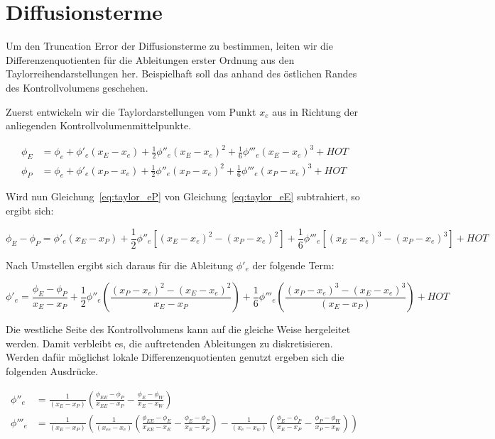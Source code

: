 \documentclass[10pt, ngerman,colorback,accentcolor=tud2d]{tudreport}
\begin{document}
\section{Diffusionsterme}
\label{sec:Diffusionsterme}


Um den Truncation Error der Diffusionsterme zu bestimmen, leiten wir die Differenzenquotienten
für die Ableitungen erster Ordnung aus den Taylorreihendarstellungen her. Beispielhaft
soll das anhand des östlichen Randes des Kontrollvolumens geschehen.

Zuerst entwickeln wir die Taylordarstellungen vom Punkt $x_e$ aus in Richtung der anliegenden
Kontrollvolumenmittelpunkte.

\begin{align}
  \phi_E &= \phi_e + \phi'_e(x_E-x_e)+\frac{1}{2}\phi''_e(x_E-x_e)^2
  +\frac{1}{6}\phi'''_e(x_E-x_e)^3+HOT
  \label{eq:taylor_eE}\\
  \phi_P &= \phi_e + \phi'_e(x_P-x_e)+\frac{1}{2}\phi''_e(x_P-x_e)^2
  +\frac{1}{6}\phi'''_e(x_P-x_e)^3+HOT
  \label{eq:taylor_eP}
\end{align}

Wird nun Gleichung~\ref{eq:taylor_eP} von Gleichung~\ref{eq:taylor_eE} subtrahiert, 
so ergibt sich:

\begin{equation*}
  \phi_E-\phi_P=\phi'_e(x_E-x_P)+
  \frac{1}{2}\phi''_e\left[{{(x_E-x_e)}^2-{(x_P-x_e)}^2}\right]+
  \frac{1}{6}\phi'''_e\left[{{(x_E-x_e)}^3-{(x_P-x_e)}^3}\right]+HOT
\end{equation*}

Nach Umstellen ergibt sich daraus für die Ableitung $\phi'_e$ der folgende Term:

\begin{equation}
  \phi'_e = \frac{\phi_E-\phi_P}{x_E-x_P}+\frac{1}{2}\phi''_e
\left({\frac{{(x_P-x_e)}^2-{(x_E-x_e)}^2}{x_E-x_P}}\right)+
\frac{1}{6} \phi'''_e \left({\frac{{(x_P-x_e)}^3-{(x_E-x_e)}^3}{(x_E-x_P)}}\right)+HOT
\end{equation}


Die westliche Seite des Kontrollvolumens kann auf die gleiche Weise hergeleitet werden.
Damit verbleibt es, die auftretenden Ableitungen zu diskretisieren. Werden dafür
möglichst lokale Differenzenquotienten genutzt ergeben sich die folgenden Ausdrücke.

\begin{align*}
  \phi''_e &= \frac{1}{(x_E-x_P)}\left({
\frac{\phi_{EE}-\phi_P}{x_{EE}-x_P}-\frac{\phi_E-\phi_W}{x_E-x_W}}\right)\\
\phi'''_e &= \frac{1}{(x_E-x_P)}\left({
\frac{1}{(x_{ee}-x_e)}
\left({\frac{\phi_{EE}-\phi_E}{x_{EE}-x_E}-\frac{\phi_E-\phi_P}{x_E-x_P} }\right)
-\frac{1}{(x_e-x_w)}
\left({\frac{\phi_E-\phi_P}{x_E-x_P} - \frac{\phi_P-\phi_W}{x_P-x_W}  }\right)
}\right)
\end{align*}
\end{document}
